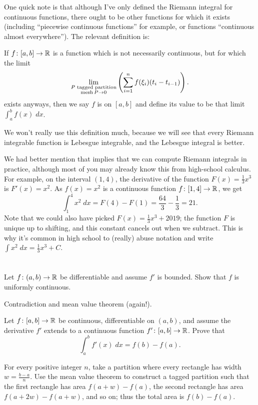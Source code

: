 One quick note is that although I've only defined
the Riemann integral for continuous functions,
there ought to be other functions for which it exists
(including ``piecewise continuous functions'' for example,
or functions ``continuous almost everywhere'').
The relevant definition is:
\begin{definition}
	If $f \colon [a,b] \to \mathbb R$ is a function
	which is not necessarily continuous,
	but for which the limit
	\[ \lim_{\substack{\text{$P$ tagged partition}
			\\ \operatorname{mesh} P \to 0}}
		\left( \sum_{i=1}^n f(\xi_i) (t_i - t_{i-1}) \right). \]
	exists anyways,
	then we say $f$ is  on $[a,b]$
	and define its value to be that limit $\int_a^b f(x) \; dx$.
\end{definition}
We won't really use this definition much,
because we will see that every Riemann integrable function
is Lebesgue integrable, and the Lebesgue integral is better.

\begin{example}
	We had better mention that 
	implies that we can compute Riemann integrals in practice,
	although most of you may already know this
	from high-school calculus.
	For example, on the interval $(1,4)$,
	the derivative of the function $F(x) = \frac13 x^3$ is $F'(x) = x^2$.
	As $f(x) = x^2$ is a continuous function $f \colon [1,4] \to \mathbb R$, we get
	\[ \int_1^4 x^2 \; dx =
		F(4) - F(1) = \frac{64}{3} - \frac13 = 21. \]
	Note that we could also have picked $F(x) = \frac13x^3 + 2019$;
	the function $F$ is unique up to shifting,
	and this constant cancels out when we subtract.
	This is why it's common in high school to (really) abuse notation
	and write $\int x^2 \; dx = \frac13x^3+C$.
\end{example}

\section{\problemhead}
\begin{problem}
	Let $f \colon (a,b) \to \mathbb R$ be differentiable
	and assume $f'$ is bounded.
	Show that $f$ is uniformly continuous.
	\begin{hint}
		Contradiction and mean value theorem (again!).
	\end{hint}
\end{problem}

\begin{sproblem}
	\label{thm:FTC}
	Let $f \colon [a,b] \to \mathbb R$ be continuous,
	differentiable on $(a,b)$,
	and assume the derivative $f'$ extends to a
	continuous function $f' \colon [a,b] \to \mathbb R$.
	Prove that
	\[ \int_a^b f'(x) \; dx = f(b) - f(a). \]
	\begin{hint}
		For every positive integer $n$,
		take a partition where every rectangle has width $w = \frac{b-a}{n}$.
		Use the mean value theorem to construct a tagged partition
		such that the first rectangle has area $f(a+w)-f(a)$,
		the second rectangle has area $f(a+2w) - f(a+w)$, and so on;
		thus the total area is $f(b) - f(a)$.
	\end{hint}
\end{sproblem}

